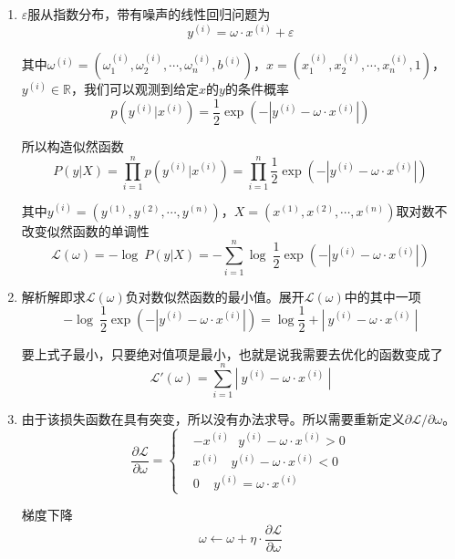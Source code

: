 
\begin{enumerate}
    \item $\varepsilon$服从指数分布，带有噪声的线性回归问题为
    \begin{equation}
        y^{(i)}=\omega\cdot x^{(i)}+\varepsilon
    \end{equation}

    其中$\omega^{(i)}=(\omega^{(i)}_1,\omega^{(i)}_2,\cdots,\omega^{(i)}_n,b^{(i)})$，$x=(x^{(i)}_1,x^{(i)}_2,\cdots,x^{(i)}_n,1)$，$y^{(i)}\in \mathbb{R}$，我们可以观测到给定$x$的$y$的条件概率
    \begin{equation}
        p(y^{(i)}|x^{(i)})=\frac{1}{2}\exp{(-|y^{(i)}-\omega\cdot x^{(i)}|)}
    \end{equation}
    
    所以构造似然函数
    \begin{equation}
        P(y|X)=\prod_{i=1}^{n}p(y^{(i)}|x^{(i)})=\prod_{i=1}^{n}\frac{1}{2}\exp{(-|y^{(i)}-\omega\cdot x^{(i)}|)}
    \end{equation}
    
    其中$y^{(i)}=(y^{(1)},y^{(2)},\cdots,y^{(n)})$，$X=(x^{(1)},x^{(2)},\cdots,x^{(n)})$取对数不改变似然函数的单调性
    \begin{equation}
        \mathcal{L}(\omega)=-\log\ P(y|X)=-\sum_{i=1}^{n}\log\ \frac{1}{2}\exp{(-|y^{(i)}-\omega\cdot x^{(i)}|)}
    \end{equation}
    \item 解析解即求$\mathcal{L}(\omega)$负对数似然函数的最小值。展开$\mathcal{L}(\omega)$中的其中一项
    \begin{equation}
        -\log\ \frac{1}{2}\exp{(-|y^{(i)}-\omega\cdot x^{(i)}|)}=\log\frac{1}{2}+|\ y^{(i)}-\omega\cdot x^{(i)}\ |
    \end{equation}

    要上式子最小，只要绝对值项是最小，也就是说我需要去优化的函数变成了
    \begin{equation}
        \mathcal{L'}(\omega)=\sum_{i=1}^{n}\left|\ y^{(i)}-\omega\cdot x^{(i)}\ \right|
    \end{equation}

    \item 由于该损失函数在具有突变，所以没有办法求导。所以需要重新定义$\partial \mathcal{L}/\partial \omega$。
    \begin{equation}
        \frac{\partial \mathcal{L}}{\partial \omega}=
        \begin{cases}
            & -x^{(i)}\ \ \ y^{(i)}-\omega\cdot x^{(i)}>0\\
            & x^{(i)}\ \ \ \ y^{(i)}-\omega\cdot x^{(i)}<0\\
            & 0 \ \ \ \ \ y^{(i)}=\omega\cdot x^{(i)}
        \end{cases}
    \end{equation}

    梯度下降
    \begin{equation}
        \omega \leftarrow \omega+\eta\cdot \frac{\partial \mathcal{L}}{\partial \omega}
    \end{equation}
\end{enumerate}

